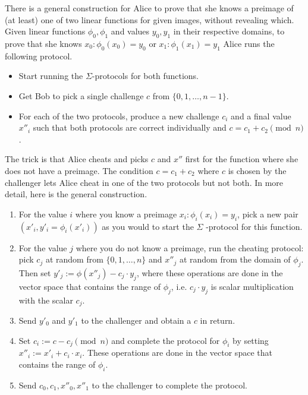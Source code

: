\documentclass[envcountsame]{llncs}
\begin{document}
There is a general construction for Alice to prove that she knows a preimage of
(at least) one of two linear functions for given images, without revealing
which. Given linear functions $\phi_0, \phi_1$ and values $y_0, y_1$ in their
respective domains, to prove that she knows $x_0: \phi_0(x_0) = y_0$ or $x_1:
\phi_1(x_1) = y_1$ Alice runs the following protocol.
\begin{itemize}
\item Start running the $\Sigma$-protocols for both functions.
\item Get Bob to pick a single challenge $c$ from $\{0, 1, \ldots, n-1\}$.
\item For each of the two protocols, produce a new challenge $c_i$ and a
final value $x''_i$ such that both protocols are correct individually and $c =
c_1 + c_2 \pmod{n}$.
\end{itemize}

The trick is that Alice cheats and picks $c$ and $x''$ first for the function
where she does not have a preimage. The condition $c = c_1 + c_2$ where $c$ is
chosen by the challenger lets Alice cheat in one of the two protocols but not
both. In more detail, here is the general construction.

\begin{enumerate}
\item For the value $i$ where you know a preimage $x_i: \phi_i(x_i) = y_i$,
pick a new pair $(x'_i, y'_i = \phi_i(x'_i))$ as you would to start the $\Sigma$
-protocol for this function.
\item For the value $j$ where you do not know a preimage, run the cheating
protocol: pick $c_j$ at random from $\{0, 1, \ldots, n\}$ and $x''_j$ at random
from the domain of $\phi_j$. Then set $y'_j := \phi(x''_j) - c_j \cdot y_j$,
where these operations are done in the vector space that contains the range of
$\phi_j$, i.e. $c_j \cdot y_j$ is scalar multiplication with the scalar $c_j$.
\item Send $y'_0$ and $y'_1$ to the challenger and obtain a $c$ in return.
\item Set $c_i := c - c_j \pmod{n}$ and complete the protocol for $\phi_i$ by
setting $x''_i := x'_i + c_i \cdot x_i$. These operations are done in the vector
space that contains the range of $\phi_i$.
\item Send $c_0, c_1, x''_0, x''_1$ to the challenger to complete the protocol.
\end{enumerate}
\end{document}
